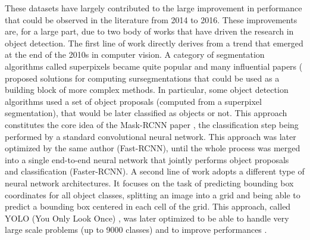 These datasets have largely contributed to the large improvement in performance that could be observed in the literature from 2014 to 2016. These improvements are, for a large part, due to two body of works that have driven the research in object detection. The first line of work directly derives from a trend that emerged at the end of the 2010s in computer vision. A category of segmentation algorithms called superpixels became quite popular and many influential papers (\cite{felzenszwalb2004efficient, achanta2012slic, levinshtein2009turbopixels} proposed solutions for computing sursegmentations that could be used as a building block of more complex methods. In particular, some object detection algorithms used a set of object proposals \cite{uijlings2013selective} (computed from a superpixel segmentation), that would be later classified as objects or not. This approach constitutes the core idea of the Mask-RCNN paper \cite{girshick2014maskrcnn}, the classification step being performed by a standard convolutional neural network. This approach was later optimized by the same author \cite{girshick2014fastrcnn} (Fast-RCNN), until the whole process was merged into a single end-to-end neural network that jointly performs object proposals and classification \cite{ren2015faster} (Faster-RCNN). A second line of work adopts a different type of neural network architectures. It focuses on the task of predicting bounding box coordinates for all object classes, splitting an image into a grid and being able to predict a bounding box centered in each cell of the grid. This approach, called YOLO (You Only Look Once) \cite{redmon2016you}, was later optimized to be able to handle very large scale problems \cite{redmon2017yolo9000} (up to 9000 classes) and to improve performances \cite{redmon2018yolov3}. 

